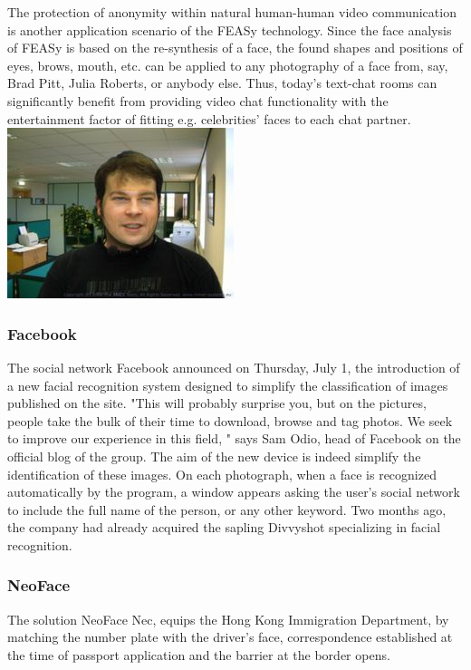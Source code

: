 The protection of anonymity within natural human-human video communication is another application scenario of the FEASy technology. Since the face analysis of FEASy is based on the re-synthesis of a face, the found shapes and positions of eyes, brows, mouth, etc. can be applied to any photography of a face from, say, Brad Pitt, Julia Roberts, or anybody else. Thus, today's text-chat rooms can significantly benefit from providing video chat functionality with the entertainment factor of fitting e.g. celebrities' faces to each chat partner.
\includegraphics[width=.6\linewidth]{img/avatarchat}

\subsubsection*{Facebook}
The social network Facebook announced on Thursday, July 1, the introduction of a new facial recognition system designed to simplify the classification of images published on the site.
"This will probably surprise you, but on the pictures, people take the bulk of their time to download, browse and tag photos. We seek to improve our experience in this field, " says Sam Odio, head of Facebook on the official blog of the group.
The aim of the new device is indeed simplify the identification of these images. On each photograph, when a face is recognized automatically by the program, a window appears asking the user's social network to include the full name of the person, or any other keyword. Two months ago, the company had already acquired the sapling Divvyshot specializing in facial recognition.

\subsubsection*{NeoFace}
The solution NeoFace Nec, equips the Hong Kong Immigration Department, by matching the number plate with the driver's face, correspondence established at the time of passport application and the barrier at the border opens.

